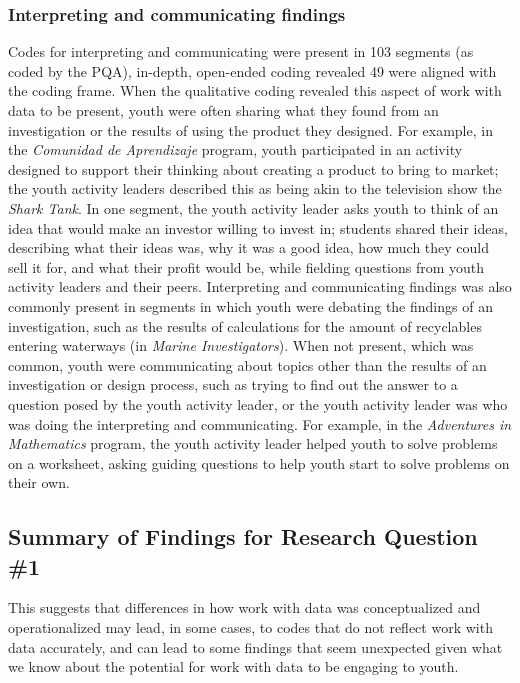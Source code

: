 \documentclass[]{msu-thesis}
\theoremstyle{definition}
\theoremstyle{definition}
\theoremstyle{definition}
\theoremstyle{remark}
\begin{document}
\subsubsection{Interpreting and communicating
findings}\label{interpreting-and-communicating-findings}

Codes for interpreting and communicating were present in 103 segments
(as coded by the PQA), in-depth, open-ended coding revealed 49 were
aligned with the coding frame. When the qualitative coding revealed this
aspect of work with data to be present, youth were often sharing what
they found from an investigation or the results of using the product
they designed. For example, in the \emph{Comunidad de Aprendizaje}
program, youth participated in an activity designed to support their
thinking about creating a product to bring to market; the youth activity
leaders described this as being akin to the television show the
\emph{Shark Tank}. In one segment, the youth activity leader asks youth
to think of an idea that would make an investor willing to invest in;
students shared their ideas, describing what their ideas was, why it was
a good idea, how much they could sell it for, and what their profit
would be, while fielding questions from youth activity leaders and their
peers. Interpreting and communicating findings was also commonly present
in segments in which youth were debating the findings of an
investigation, such as the results of calculations for the amount of
recyclables entering waterways (in \emph{Marine Investigators}). When
not present, which was common, youth were communicating about topics
other than the results of an investigation or design process, such as
trying to find out the answer to a question posed by the youth activity
leader, or the youth activity leader was who was doing the interpreting
and communicating. For example, in the \emph{Adventures in Mathematics}
program, the youth activity leader helped youth to solve problems on a
worksheet, asking guiding questions to help youth start to solve
problems on their own.

\subsection{Summary of Findings for Research Question
\#1}\label{summary-of-findings-for-research-question-1}

This suggests that differences in how work with data was conceptualized
and operationalized may lead, in some cases, to codes that do not
reflect work with data accurately, and can lead to some findings that
seem unexpected given what we know about the potential for work with
data to be engaging to youth.
\end{document}
